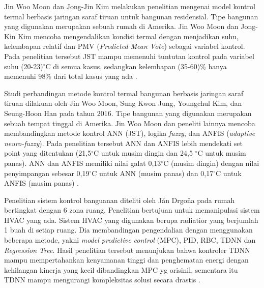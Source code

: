 Jin Woo Moon dan Jong-Jin Kim melakukan penelitian mengenai model kontrol termal berbasis jaringan saraf tiruan untuk bangunan residensial. Tipe bangunan yang digunakan merupakan sebuah rumah di Amerika. Jin Woo Moon dan Jong-Kin Kim mencoba mengendalikan kondisi termal dengan menjadikan suhu, kelembapan relatif dan PMV (\textit{Predicted Mean Vote}) sebagai variabel kontrol. Pada penelitian tersebut JST mampu memenuhi tuntutan kontrol pada variabel suhu (20-23)$^\circ$C di semua kasus, sedangkan kelembapan (35-60)\% hanya memenuhi 98\% dari total kasus yang ada \cite{paper22JJkim}.

Studi perbandingan metode kontrol termal bangunan berbasis jaringan saraf tiruan dilakuan oleh Jin Woo Moon, Sung Kwon Jung, Youngchul Kim, dan Seung-Hoon Han pada tahun 2016. Tipe bangunan yang digunakan merupakan sebuah tempat tinggal di Amerika. Jin Woo Moon dan peneliti lainnya mencoba membandingkan metode kontrol ANN (JST), logika \textit{fuzzy}, dan ANFIS (\textit{adaptive neuro-fuzzy}). Pada penelitian tersebut ANN dan ANFIS lebih mendekati set point yang ditentukan (21,5$^{\circ}$C untuk musim dingin dan 24,5 $^{\circ}$C untuk musim panas). ANN dan ANFIS memiliki nilai galat 0,13$^{\circ}$C (musim dingin) dengan nilai penyimpangan sebesar 0,19$^{\circ}$C untuk ANN (musim panas) dan 0,17$^{\circ}$C untuk ANFIS (musim panas) \cite{paper22SKJung}.


Penelitian sistem kontrol banguanan diteliti oleh Ján Drgoňa pada rumah bertingkat dengan 6 zona ruang. Penelitian bertujuan untuk memanipulasi sistem HVAC yang ada. Sistem HVAC yang digunakan berupa radiatior yang berjumlah 1 buah di setiap ruang. Dia membandingan pengendalian dengan menggunakan beberapa metode, yakni \textit{model predictive control} (MPC), PID, RBC, TDNN dan \textit{Regression Tree}. Hasil penelitian tersebut menunjukan bahwa kontroler TDNN mampu mempertahankan kenyamanan tinggi dan penghematan energi dengan kehilangan kinerja yang kecil dibandingkan MPC yg orisinil, sementara itu TDNN mampu mengurangi kompleksitas solusi secara drastis \cite{paper22JanDrgona}.

